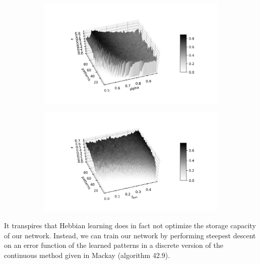 \documentclass{article}
\begin{document}
\begin{figure}[h]
	\centering
	\begin{subfigure}[t]{0.45\linewidth}
		\centering
		\includegraphics[width = 1.0\linewidth, trim={0 7 0 0}, clip=true]{scan_alpha_npat.png}
		\label{fig:alpha}	
	\end{subfigure}%
	\hspace{0.001\linewidth}
	\begin{subfigure}[t]{0.45\linewidth}
		\centering
		\includegraphics[width = 1.0\linewidth, trim={0 7 0 0}, clip=true]{scan_floss_npat.png}
		\label{fig:floss}	
	\end{subfigure}%
\end{figure}


It transpires that Hebbian learning does in fact not optimize the storage capacity of our network. Instead, we can train our network by performing steepest descent on an error function of the learned patterns in a discrete version of the continuous method given in Mackay (algorithm 42.9).
\end{document}

